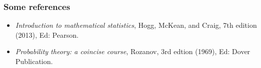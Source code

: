 \documentclass[notes=show,handout]{beamer}\usepackage[]{graphicx}\usepackage[]{color}
\newtheorem{interpretation}{Interpretation}[section]
\begin{document}
\begin{frame}
\frametitle{Some references}


\vspace{1.5cm}
\begin{itemize}
\item \textit{Introduction to mathematical statistics}, Hogg, McKean, and Craig, 7th edition (2013), Ed: Pearson.
\vspace{0.25cm}
\item \textit{Probability theory: a coincise course}, Rozanov, 3rd edtion (1969), Ed: Dover Publication.
\end{itemize}

\end{frame}
%
%
%
%
%
%
%
\end{document}
